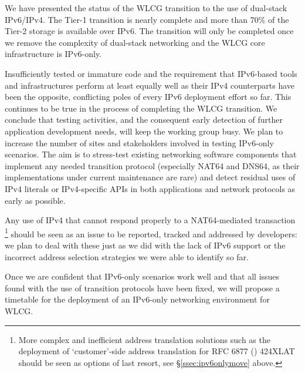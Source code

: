 
We have presented the status of the WLCG transition to the use of dual-stack IPv6/IPv4. The Tier-1 transition is nearly complete and 
more than 70\% of the Tier-2 storage is available over IPv6. The transition will only be completed once we remove the complexity of
dual-stack networking and the WLCG core infrastructure is IPv6-only.


Insufficiently tested or immature code and the requirement that IPv6-based
tools and infrastructures perform at least equally well as their IPv4
counterparts have been the opposite, conflicting poles of every IPv6
deployment effort so far. This continues to be true in the process
of completing the WLCG transition. We conclude that
testing activities, and the consequent early detection of further application
development needs, will keep the working group busy. We plan
to increase the number of sites and stakeholders involved in testing IPv6-only 
scenarios. The aim is to stress-test existing networking software components
that implement any needed transition protocol (especially NAT64 and DNS64, as 
their implementations under current maintenance are rare) and detect
residual uses of IPv4 literals or IPv4-specific APIs in both applications and
network protocols as early as possible.\par
Any use of IPv4 that cannot respond properly to a NAT64-mediated
transaction
\footnote{More complex and inefficient address
translation solutions such as the deployment of `customer'-side address
translation for RFC 6877 (\cite{rfc}) 424XLAT should be
seen as options of last resort, see \S \ref{ssec:ipv6onlymove} above.}
should be seen as an issue to be reported, tracked and
addressed by developers: we plan to deal with these just as we did
with the lack of IPv6 support or the incorrect address selection
strategies we were able to identify so far.\par
Once we are confident that IPv6-only scenarios work well and that
all issues found with the use of transition protocols have been fixed, we will
propose a timetable for the deployment of an IPv6-only networking 
environment for WLCG.
